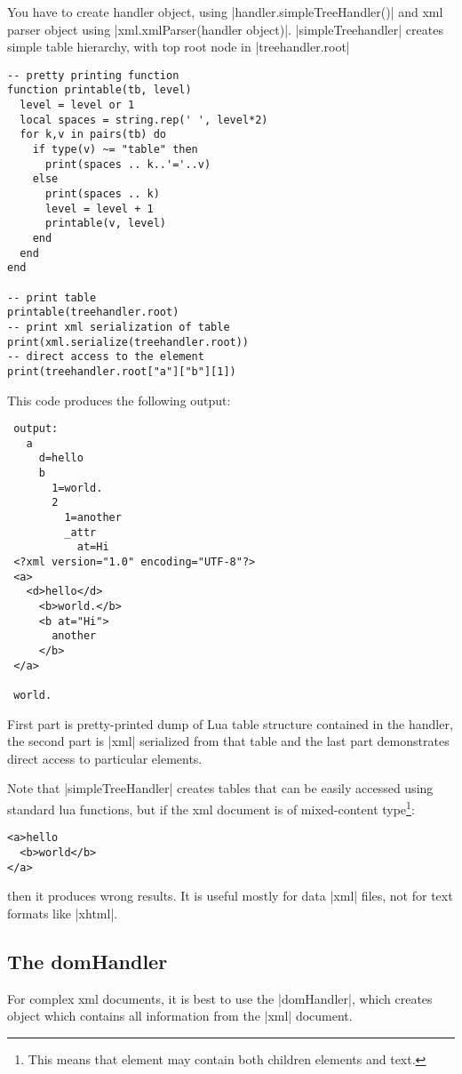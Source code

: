 \documentclass{ltxdoc}
\begin{document}
You have to create handler object, using |handler.simpleTreeHandler()| and xml
parser object using |xml.xmlParser(handler object)|. |simpleTreehandler|
creates simple table hierarchy, with top root node in |treehandler.root|

\begin{verbatim}
-- pretty printing function
function printable(tb, level)
  level = level or 1
  local spaces = string.rep(' ', level*2)
  for k,v in pairs(tb) do
    if type(v) ~= "table" then
      print(spaces .. k..'='..v)
    else
      print(spaces .. k)
      level = level + 1
      printable(v, level)
    end
  end
end

-- print table
printable(treehandler.root)
-- print xml serialization of table
print(xml.serialize(treehandler.root))
-- direct access to the element
print(treehandler.root["a"]["b"][1])
\end{verbatim}

This code produces the following output:

\begin{verbatim}
 output:
   a
     d=hello
     b
       1=world.
       2
         1=another
         _attr
           at=Hi
 <?xml version="1.0" encoding="UTF-8"?>
 <a>
   <d>hello</d>
     <b>world.</b>
     <b at="Hi">
       another
     </b>
 </a>
 
 world.
\end{verbatim}

First part is pretty-printed dump of Lua table structure contained in the handler, the second
part is |xml| serialized from that table and the last part demonstrates direct access to particular
elements.

Note that |simpleTreeHandler| creates tables that can be easily accessed using
standard lua functions, but if the xml document is of mixed-content type\footnote{%
This means that element may contain both children elements and text.}:

\begin{verbatim}
<a>hello
  <b>world</b>
</a>	  
\end{verbatim}

\noindent then it produces wrong results. It is useful mostly for data |xml| files, not for
text formats like |xhtml|.

\subsection{The domHandler}

For complex xml documents, it is best to use the |domHandler|, which creates object which contains all information
from the |xml| document. 
\end{document}

